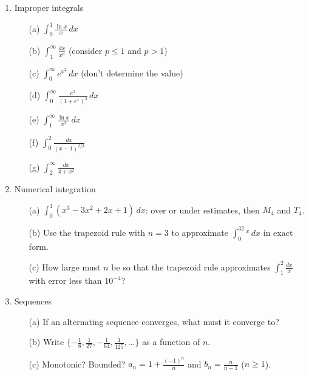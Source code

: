 \documentclass[12pt]{article}
\begin{document}
\begin{enumerate}
\begin{enumerate}
\end{enumerate}

\setcounter{enumi}{12}
\item Improper integrals
\begin{enumerate}
\item[(a)] $\int_0^1\frac{\ln x}{x}\,dx$

\item[(b)] $\int_1^\infty\frac{dx}{x^p}$ (consider $p\le1$ and $p>1$)

\item[(c)] $\int_0^\infty e^{x^2}\,dx$ (don't determine the value)

\item[(d)] $\int_0^\infty\frac{e^x}{(1+e^x)^3}\,dx$

\item[(e)] $\int_1^\infty\frac{\ln x}{x^3}\,dx$

\item[(f)] $\int_0^2\frac{dx}{(x-1)^{2/3}}$

\item[(g)] $\int_2^\infty\frac{dx}{4+x^2}$

\end{enumerate}

\setcounter{enumi}{13}
\item Numerical integration
\begin{enumerate}
\item[(a)] $\int_0^1(x^3-3x^2+2x+1)\,dx$: over or under estimates, then $M_4$ and $T_4$.

\item[(b)] Use the trapezoid rule with $n=3$ to approximate $\int_0^32^x\,dx$ in exact form.

\item[(c)] How large must $n$ be so that the trapezoid rule approximates $\int_1^2\frac{dx}{x}$ with error less than $10^{-4}$?

\end{enumerate}

\setcounter{enumi}{14}
\item Sequences
\begin{enumerate}
\item[(a)] If an alternating sequence converges, what must it converge to?

\item[(b)] Write $\{-\frac18,\frac1{27},-\frac1{64},\frac1{125},\dots\}$ as a function of $n$.

\item[(c)] Monotonic? Bounded? $a_n=1+\frac{(-1)^n}{n}$ and $b_n=\frac{n}{n+1}$ ($n\ge1$).


\end{enumerate}
\end{enumerate}
\end{document}
